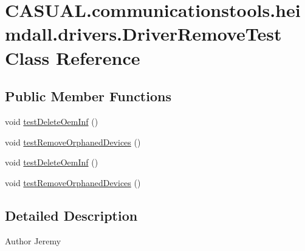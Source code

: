\hypertarget{class_c_a_s_u_a_l_1_1communicationstools_1_1heimdall_1_1drivers_1_1_driver_remove_test}{\section{C\-A\-S\-U\-A\-L.\-communicationstools.\-heimdall.\-drivers.\-Driver\-Remove\-Test Class Reference}
\label{class_c_a_s_u_a_l_1_1communicationstools_1_1heimdall_1_1drivers_1_1_driver_remove_test}
}
\subsection*{Public Member Functions}
\begin{DoxyCompactItemize}
\item 
void \hyperlink{class_c_a_s_u_a_l_1_1communicationstools_1_1heimdall_1_1drivers_1_1_driver_remove_test_af02e49e68a291e53078e58dfc1c49a7d}{test\-Delete\-Oem\-Inf} ()
\item 
void \hyperlink{class_c_a_s_u_a_l_1_1communicationstools_1_1heimdall_1_1drivers_1_1_driver_remove_test_a8cfbd154d301edfcee6b8546a5f1285d}{test\-Remove\-Orphaned\-Devices} ()
\item 
void \hyperlink{class_c_a_s_u_a_l_1_1communicationstools_1_1heimdall_1_1drivers_1_1_driver_remove_test_af02e49e68a291e53078e58dfc1c49a7d}{test\-Delete\-Oem\-Inf} ()
\item 
void \hyperlink{class_c_a_s_u_a_l_1_1communicationstools_1_1heimdall_1_1drivers_1_1_driver_remove_test_a8cfbd154d301edfcee6b8546a5f1285d}{test\-Remove\-Orphaned\-Devices} ()
\end{DoxyCompactItemize}


\subsection{Detailed Description}
\begin{DoxyAuthor}{Author}
Jeremy 
\end{DoxyAuthor}



